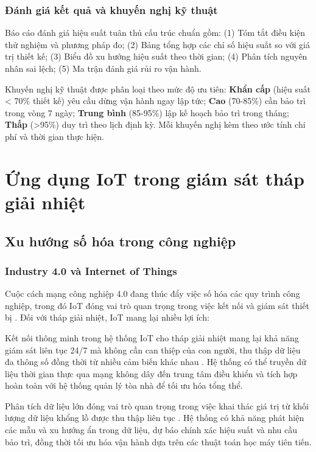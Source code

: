 \documentclass[../main.tex]{subfiles}
\begin{document}
\subsubsection{Đánh giá kết quả và khuyến nghị kỹ thuật}
Báo cáo đánh giá hiệu suất tuân thủ cấu trúc chuẩn gồm: (1) Tóm tắt điều kiện thử nghiệm và phương pháp đo; (2) Bảng tổng hợp các chỉ số hiệu suất so với giá trị thiết kế; (3) Biểu đồ xu hướng hiệu suất theo thời gian; (4) Phân tích nguyên nhân sai lệch; (5) Ma trận đánh giá rủi ro vận hành.

Khuyến nghị kỹ thuật được phân loại theo mức độ ưu tiên: \textbf{Khẩn cấp} (hiệu suất < 70\% thiết kế) yêu cầu dừng vận hành ngay lập tức; \textbf{Cao} (70-85\%) cần bảo trì trong vòng 7 ngày; \textbf{Trung bình} (85-95\%) lập kế hoạch bảo trì trong tháng; \textbf{Thấp} (>95\%) duy trì theo lịch định kỳ. Mỗi khuyến nghị kèm theo ước tính chi phí và thời gian thực hiện.

\section{Ứng dụng IoT trong giám sát tháp giải nhiệt}
\label{sec:iot_applications_cooling_towers}

\subsection{Xu hướng số hóa trong công nghiệp}
\label{sec:digitalization_trends}

\subsubsection{Industry 4.0 và Internet of Things}
Cuộc cách mạng công nghiệp 4.0 đang thúc đẩy việc số hóa các quy trình công nghiệp, trong đó IoT đóng vai trò quan trọng trong việc kết nối và giám sát thiết bị \cite{zhang2022iot}. Đối với tháp giải nhiệt, IoT mang lại nhiều lợi ích:

Kết nối thông minh trong hệ thống IoT cho tháp giải nhiệt mang lại khả năng giám sát liên tục 24/7 mà không cần can thiệp của con người, thu thập dữ liệu đa thông số đồng thời từ nhiều cảm biến khác nhau \cite{statista2023iot}. Hệ thống có thể truyền dữ liệu thời gian thực qua mạng không dây đến trung tâm điều khiển và tích hợp hoàn toàn với hệ thống quản lý tòa nhà để tối ưu hóa tổng thể.

Phân tích dữ liệu lớn đóng vai trò quan trọng trong việc khai thác giá trị từ khối lượng dữ liệu khổng lồ được thu thập liên tục \cite{cisco2023iot}. Hệ thống có khả năng phát hiện các mẫu và xu hướng ẩn trong dữ liệu, dự báo chính xác hiệu suất và nhu cầu bảo trì, đồng thời tối ưu hóa vận hành dựa trên các thuật toán học máy tiên tiến.
\end{document}
